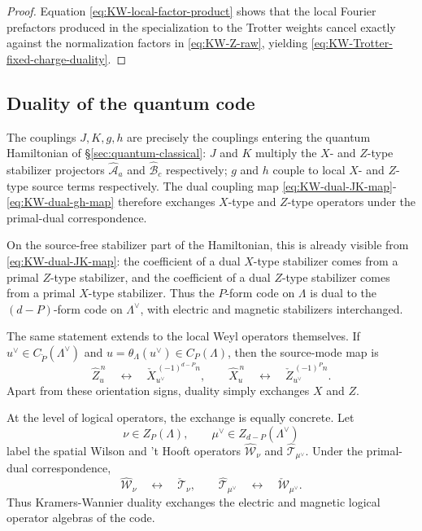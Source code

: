 \documentclass[dvipsnames,a4paper]{article}
\numberwithin{equation}{section}
\theoremstyle{definition}
\theoremstyle{remark}
\begin{document}
\begin{proof}
	Equation \eqref{eq:KW-local-factor-product} shows that the local Fourier prefactors
	produced in the specialization to the Trotter weights cancel exactly against the normalization factors in \eqref{eq:KW-Z-raw}, yielding
	\eqref{eq:KW-Trotter-fixed-charge-duality}.
\end{proof}

\subsection{Duality of the quantum code}
\label{sec:KW-quantum-code}

The couplings \(J,K,g,h\) are precisely the couplings entering the quantum Hamiltonian of
\S\ref{sec:quantum-classical}: \(J\) and $K$ multiply the \(X\)- and $Z$-type stabilizer projectors
\(\hat{\mathcal A}_a\) and \(\hat{\mathcal B}_c\) respectively;  \(g\) and $h$ couple to local \(X\)- and $Z$-type source terms respectively. The dual coupling map
\eqref{eq:KW-dual-JK-map}-\eqref{eq:KW-dual-gh-map} therefore exchanges \(X\)-type and
\(Z\)-type operators under the primal-dual correspondence.

On the source-free stabilizer part of the Hamiltonian, this is already visible from
\eqref{eq:KW-dual-JK-map}: the coefficient of a dual \(X\)-type stabilizer comes from a
primal \(Z\)-type stabilizer, and the coefficient of a dual \(Z\)-type stabilizer comes
from a primal \(X\)-type stabilizer. Thus the \(P\)-form code on \(\Lambda\) is dual to
the \((d-P)\)-form code on \(\Lambda^\vee\), with electric and magnetic stabilizers
interchanged.

The same statement extends to the local Weyl operators themselves. If
\(u^\vee\in C_{\check P}(\Lambda^\vee)\) and \(u=\theta_\Lambda(u^\vee)\in C_P(\Lambda)\),
then the source-mode map is
\begin{equation}
	\hat Z_u^{\,n}
	\quad\longleftrightarrow\quad
	\check X_{u^\vee}^{\,(-1)^{d-P}n},
	\qquad
	\hat X_u^{\,n}
	\quad\longleftrightarrow\quad
	\check Z_{u^\vee}^{\,(-1)^P n}.
	\label{eq:KW-local-XZ-swap}
\end{equation}
Apart from these orientation signs, duality simply exchanges \(X\) and \(Z\).

At the level of logical operators, the exchange is equally concrete. Let
\begin{equation}
\nu\in Z_P(\Lambda),
\qquad
\mu^\vee\in Z_{d-P}(\Lambda^\vee)
\end{equation}
label the spatial Wilson and 't Hooft operators
\(\hat{\mathcal W}_\nu\) and \(\hat{\mathcal T}_{\mu^\vee}\). Under the primal-dual
correspondence,
\begin{equation}
	\hat{\mathcal W}_\nu
	\quad\longleftrightarrow\quad
	\check{\mathcal T}_{\nu},
	\qquad
	\hat{\mathcal T}_{\mu^\vee}
	\quad\longleftrightarrow\quad
	\check{\mathcal W}_{\mu^\vee}.
	\label{eq:KW-logical-operator-swap}
\end{equation}
Thus Kramers-Wannier duality exchanges the electric and magnetic logical operator algebras
of the code.
\end{document}
